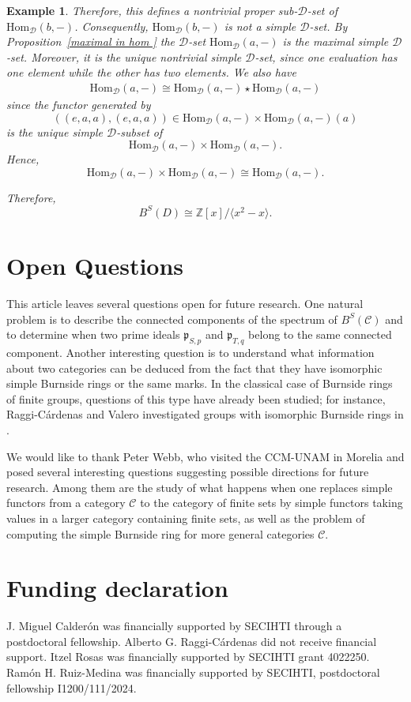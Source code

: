 \documentclass[a4paper]{article}
\newtheorem{exam}[thm]{Example}
\theoremstyle{definition}
\theoremstyle{remark}
\newcommand*{\cat}[1]{\mathcal{#1}}
\begin{document}
\begin{exam}
Therefore, this defines a nontrivial proper sub-$\cat{D}$-set of $\mathrm{Hom}_{\cat{D}}(b,-)$. Consequently, $ 
\mathrm{Hom}_{\cat{D}}(b,-)
$ 
is not a simple $\cat{D}$-set. By Proposition~\ref{maximal in hom } the $\cat{D}$-set $\mathrm{Hom}_{\cat{D}}(a,-)$ is the maximal simple $\cat{D}$-set. Moreover, it is the unique nontrivial  simple $\cat{D}$-set, since one evaluation has one element while the other has two elements. We also have
\begin{align*}
    \mathrm{Hom}_{\cat{D}}(a,-)\cong \mathrm{Hom}_{\cat{D}}(a,-)\star \mathrm{Hom}_{\cat{D}}(a,-)
\end{align*}
since the functor generated by
\[
((e,a,a),(e,a,a))
\in
\mathrm{Hom}_{\cat{D}}(a,-)\times \mathrm{Hom}_{\cat{D}}(a,-)(a)
\]
is the unique simple $\cat{D}$-subset of
\[
\mathrm{Hom}_{\cat{D}}(a,-)\times \mathrm{Hom}_{\cat{D}}(a,-).
\]
Hence,
\[
\mathrm{Hom}_{\cat{D}}(a,-)\times \mathrm{Hom}_{\cat{D}}(a,-)
\cong
\mathrm{Hom}_{\cat{D}}(a,-).
\]

Therefore,
\[
B^S(D)\cong \mathbb{Z}[x]/\langle x^2-x \rangle .
\]
\end{exam}
\section*{Open Questions}

This article leaves several questions open for future research. One natural problem is to describe the connected components of the spectrum of $B^S(\cat{C})$ and to determine when two prime ideals $\mathfrak{p}_{S,p}$ and $\mathfrak{p}_{T,q}$ belong to the same connected component. Another interesting question is to understand what information about two categories can be deduced from the fact that they have isomorphic simple Burnside rings or the same marks. In the classical case of Burnside rings of finite groups, questions of this type have already been studied; for instance, Raggi-Cárdenas and Valero investigated groups with isomorphic Burnside rings in \cite{raggi2005groups}.

We would like to thank Peter Webb, who visited the CCM-UNAM in Morelia and posed several interesting questions suggesting possible directions for future research. Among them are the study of what happens when one replaces simple functors from a category $\cat{C}$ to the category of finite sets by simple functors taking values in a larger category containing finite sets, as well as the problem of computing the simple Burnside ring for more general categories $\cat{C}$.
\section*{Funding declaration}

J. Miguel Calder\'on was financially supported by SECIHTI through a postdoctoral fellowship. Alberto G. Raggi-C\'ardenas did not receive financial support. Itzel Rosas was financially supported by SECIHTI grant 4022250. Ram\'on H. Ruiz-Medina was financially supported by SECIHTI, postdoctoral fellowship I1200/111/2024.



\end{document}
